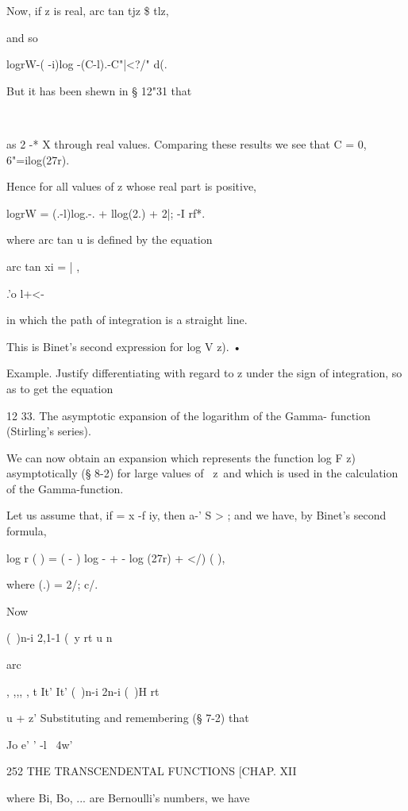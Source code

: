 Now, if z is real,   arc tan tjz \$ tlz, 

and so 

logrW-( -i)log -(C-l).-C"|<?/" d(. 

But it has been shewn in § 12"31 that 

\ \   %

as 2 -* X through real values. Comparing these results we see that C = 0, 
6"=ilog(27r). 

Hence for all values of z whose real part is positive, 

logrW = (.-l)log.-. + llog(2.) + 2|; -I  rf*. 

where arc tan u is defined by the equation 

arc tan xi = |   , 

.'o l+<- 

in which the path of integration is a straight line. 

This is Binet's second expression for log V  z). • 

Example. Justify differentiating with regard to z under the sign of integration, so as 
to get the equation 

12 33. The asymptotic expansion of the logarithm of the Gamma- 
function (Stirling's series). 

We can now obtain an expansion which represents the function log F  z) 
asymptotically (§ 8-2) for large values of \ z\, and which is used in the 
calculation of the Gamma-function. 

Let us assume that, if   = x -f iy, then a-'   S > ; and we have, by Binet's 
second formula, 

log r ( ) = (  -  ) log   -   + - log (27r) + </) ( ), 

where  (.) = 2/;    c/. 

Now 

(\ )n-i  2,1-1 (\ y  rt u n   



arc 



, ,,, , t It' It' (\ )n-i 2n-i (\ )H rt 



u  + z' 
Substituting and remembering (§ 7-2) that 

Jo e' ' -l ~4w' 



252 THE TRANSCENDENTAL FUNCTIONS [CHAP. XII 

where Bi, Bo, ... are Bernoulli's numbers, we have 

